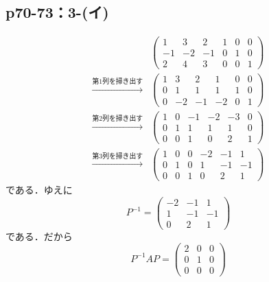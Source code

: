 \documentclass[a4paper,10pt,fleqn]{ltjsarticle}
\begin{document}
\subsection*{p70-73：3-(イ)}

\begin{leftbar}
    \begin{align*}
                                        &
        \left(
        \begin{array}{ccc|ccc}
                1  & 3  & 2  & 1 & 0 & 0 \\
                -1 & -2 & -1 & 0 & 1 & 0 \\
                2  & 4  & 3  & 0 & 0 & 1
            \end{array}
        \right)                           \\
        \xrightarrow{\text{第$1$列を掃き出す}} &
        \left(
        \begin{array}{ccc|ccc}
                1 & 3  & 2  & 1  & 0 & 0 \\
                0 & 1  & 1  & 1  & 1 & 0 \\
                0 & -2 & -1 & -2 & 0 & 1
            \end{array}
        \right)                           \\
        \xrightarrow{\text{第$2$列を掃き出す}} &
        \left(
        \begin{array}{ccc|ccc}
                1 & 0 & -1 & -2 & -3 & 0 \\
                0 & 1 & 1  & 1  & 1  & 0 \\
                0 & 0 & 1  & 0  & 2  & 1
            \end{array}
        \right)                           \\
        \xrightarrow{\text{第$3$列を掃き出す}} &
        \left(
        \begin{array}{ccc|ccc}
                1 & 0 & 0 & -2 & -1 & 1  \\
                0 & 1 & 0 & 1  & -1 & -1 \\
                0 & 0 & 1 & 0  & 2  & 1
            \end{array}
        \right)
    \end{align*}
    である．ゆえに
    \[
        P^{-1} = \begin{pmatrix} -2 & -1 & 1\\ 1 & -1 & -1 \\ 0 & 2 & 1 \end{pmatrix}
    \]
    である．だから
    \[
        P^{-1} A P = \begin{pmatrix} 2 & 0 & 0 \\ 0 & 1 & 0 \\ 0 & 0 & 0 \end{pmatrix}
    \]
\end{leftbar}
\end{document}
